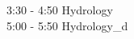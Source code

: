 \documentclass[landscape,letterpaper]{article}
\begin{document}
\begin{calendar}{\hsize}

\setcounter{calendardate}{4} %


\BlankDay 

\BlankDay

\BlankDay

\BlankDay


\BlankDay
 


\BlankDay


\BlankDay




\BlankDay 

\day{}
{
3:30 - 4:50  Hydrology\\
5:00 - 5:50  Hydrology_d\\
}


\end{calendar}
\end{document}

